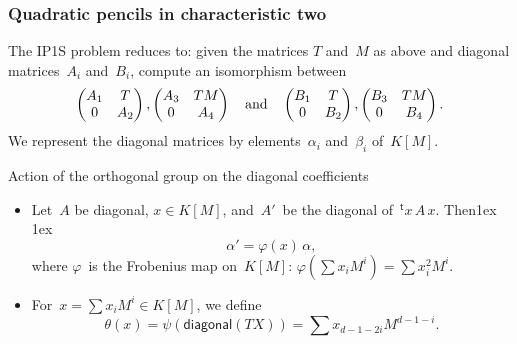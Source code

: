 \documentclass{beamer}%
\def\transpose{{}^{\mathrm{\scriptscriptstyle t}}\!}
\def\mat#1{\begin{pmatrix}#1\end{pmatrix}}
\let\mathrm\mathsf
\begin{document}
\begin{frame}\frametitle{Quadratic pencils in characteristic two}%
The IP1S problem reduces to: given the matrices $T$ and~$M$ as above and
diagonal matrices~$A_i$ and~$B_i$, compute an isomorphism between
\begin{equation*}\belowdisplayskip 1ex
\mat{A_1 & T\\0 & A_2}, \mat{A_3 & TM\\0 & A_4} \quad\text{and}\quad
\mat{B_1 & T\\0 & B_2}, \mat{B_3 & TM\\0 & B_4}.
\end{equation*}
We represent the diagonal matrices by elements~$α_i$ and~$β_i$ of~$K[M]$.

\begin{block}{Action of the orthogonal group on the diagonal coefficients}
\begin{itemize}
\item Let~$A$ be diagonal, $x ∈ K[M]$, and~$A'$~be the diagonal
of~$\transpose{x}\,A\,x$. Then\abovedisplayskip 1ex \belowdisplayskip 1ex
\begin{equation*}
α' = φ(x)\, α,
\end{equation*}
where $φ$~is the Frobenius map on~$K[M]$: $φ(∑ x_i M^i) = ∑ x_i^2 M^i$.
\smallskip
\item For~$x = ∑ x_i M^i ∈ K[M]$, we define
\belowdisplayskip 0pt
\begin{equation*}
θ(x) = ψ(\mathrm{diagonal}(TX)) = ∑ x_{d-1-2i} M^{d-1-i}.
\end{equation*}
\end{itemize}
\end{block}
\end{frame}%
\end{document}
